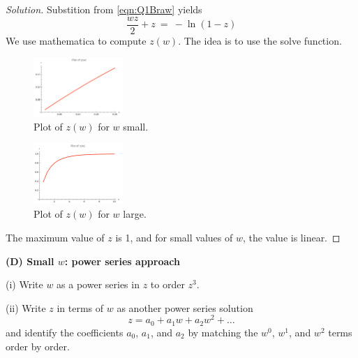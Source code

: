 \documentclass{article}
\numberwithin{equation}{section}
\begin{document}
\begin{proof}[Solution]
    Substition from \eqref{eqn:Q1Braw} yields 
    \begin{equation}\label{eqn:Q1wzrelation}
        \frac {wz} 2 + z \ = \ -\ln (1-z)
    \end{equation}
    We use mathematica to compute $z(w)$. The idea is to use the solve function. 
    
     \begin{figure}[h]
        \centering
        \includegraphics[width=0.3\textwidth]{Q1Csmall.png} %
        \caption{Plot of $z(w)$ for $w$ small.}
        \label{fig:Q1Csmall}
    \end{figure}
    \begin{figure}[h]
        \centering
        \includegraphics[width=0.3\textwidth]{Q1C.png} %
        \caption{Plot of $z(w)$ for $w$ large.}
        \label{fig:Q1C}
    \end{figure}
    The maximum value of $z$ is 1, and for small values of $w$, the 
    value is linear. 
\end{proof}

\textbf{(D) Small $w$: power series approach}

(i) Write $w$ as a power series in $z$ to order $z^3$.

(ii) Write $z$ in terms of $w$ as another power series solution
\begin{equation}\label{eqn:1D}
z = a_0 + a_1w + a_2w^2 + \dots
\end{equation}
and identify the coefficients $a_0$, $a_1$, and $a_2$ by matching the $w^0$, $w^1$, and $w^2$ terms order by order.
\end{document}
